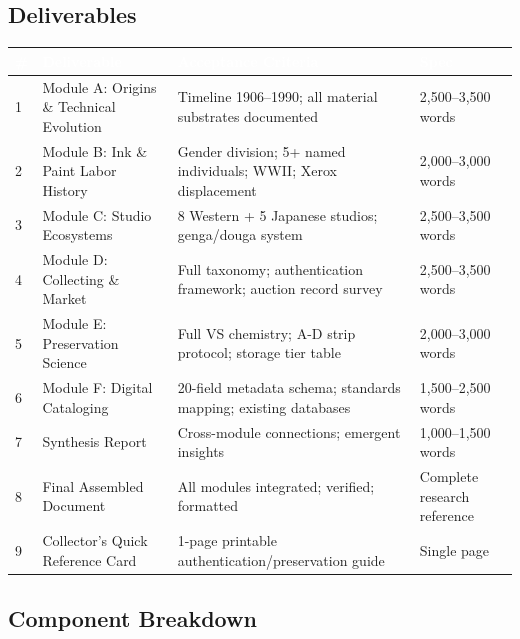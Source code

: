\documentclass[11pt,letterpaper]{article}
\newcommand{\tableheader}[1]{\textbf{\sffamily\textcolor{white}{#1}}}
\begin{document}
\subsection{Deliverables}

\begin{center}
\begin{tabularx}{\textwidth}{C{0.5cm}L{3.5cm}L{3cm}X}
\toprule
{}
\tableheader{\#} & \tableheader{Deliverable} & \tableheader{Acceptance Criteria} & \tableheader{Spec} \\
 & Module A: Origins \& Technical Evolution & Timeline 1906--1990; all material substrates documented & 2,500--3,500 words \\
2 & Module B: Ink \& Paint Labor History & Gender division; 5+ named individuals; WWII; Xerox displacement & 2,000--3,000 words \\
3 & Module C: Studio Ecosystems & 8 Western + 5 Japanese studios; genga/douga system & 2,500--3,500 words \\
4 & Module D: Collecting \& Market & Full taxonomy; authentication framework; auction record survey & 2,500--3,500 words \\
5 & Module E: Preservation Science & Full VS chemistry; A-D strip protocol; storage tier table & 2,000--3,000 words \\
6 & Module F: Digital Cataloging & 20-field metadata schema; standards mapping; existing databases & 1,500--2,500 words \\
7 & Synthesis Report & Cross-module connections; emergent insights & 1,000--1,500 words \\
8 & Final Assembled Document & All modules integrated; verified; formatted & Complete research reference \\
9 & Collector's Quick Reference Card & 1-page printable authentication/preservation guide & Single page \\
\bottomrule
\end{tabularx}
\end{center}

\subsection{Component Breakdown}
\end{document}

